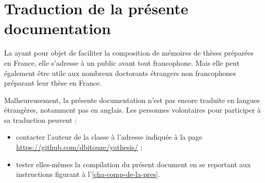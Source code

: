 \chapter{Traduction de la présente documentation}\label{cha-trad-de-la-pres}

%
%

La \yatCl{} ayant pour objet de faciliter la composition de mémoires de thèses
préparées en France, elle s'adresse à un public avant tout francophone. Mais
elle peut également être utile aux nombreux doctorants étrangers non
francophones préparant leur thèse en France.

Malheureusement, la présente documentation n'est pas encore traduite en langues
étrangères, notamment pas en anglais. Les personnes volontaires pour participer
à sa traduction peuvent :
\begin{itemize}
\item contacter l'auteur de la classe à l'adresse indiquée à la page
  \url{https://github.com/dbitouze/yathesis/} ;
\item tester elles-mêmes la compilation du présent document en se reportant aux
  instructions figurant à l'\vref{cha-comp-de-la-pres}.
\end{itemize}



